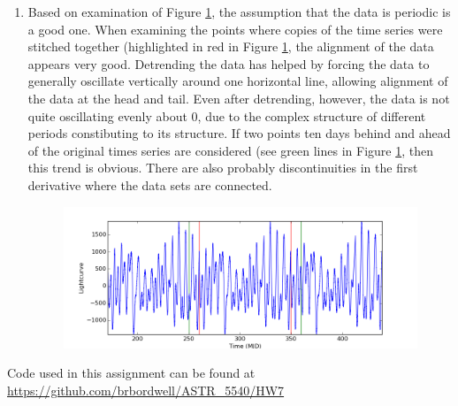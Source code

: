 \documentclass[10pt, preprint]{aastex}
\begin{document}
\begin{enumerate}
\item Based on examination of Figure \ref{fig4}, the assumption that the data is periodic is a good one. When examining the points where copies of the time series were stitched together (highlighted in red in Figure \ref{fig4}, the alignment of the data appears very good. Detrending the data has helped by forcing the data to generally oscillate vertically around one horizontal line, allowing alignment of the data at the head and tail. Even after detrending, however, the data is not quite oscillating evenly about 0, due to the complex structure of different periods constibuting to its structure. If two points ten days behind and ahead of the original times series are considered (see green lines in Figure \ref{fig4}, then this trend is obvious. There are also probably discontinuities in the first derivative where the data sets are connected.
\begin{figure}[!ht]
\centering
\includegraphics[width=6in]{hw7_fig4.png}
\caption{\centering \label{fig4}}
\end{figure}


\end{enumerate}

Code used in this assignment can be found at \url{https://github.com/brbordwell/ASTR_5540/HW7}
\end{document}
